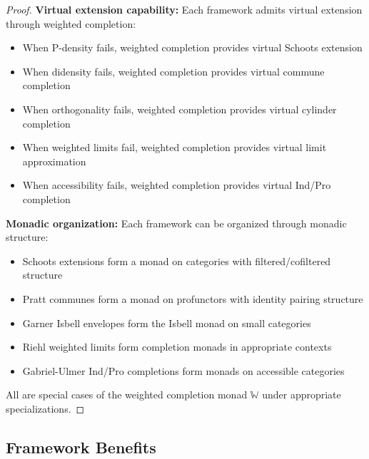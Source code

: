 \documentclass[11pt]{article}
\theoremstyle{plain}
\theoremstyle{definition}
\theoremstyle{remark}
\begin{document}
\begin{proof}
\textbf{Virtual extension capability:} Each framework admits virtual extension through weighted completion:

\begin{itemize}
\item When P-density fails, weighted completion provides virtual Schoots extension
\item When didensity fails, weighted completion provides virtual commune completion
\item When orthogonality fails, weighted completion provides virtual cylinder completion
\item When weighted limits fail, weighted completion provides virtual limit approximation
\item When accessibility fails, weighted completion provides virtual Ind/Pro completion
\end{itemize}

\textbf{Monadic organization:} Each framework can be organized through monadic structure:
\begin{itemize}
\item Schoots extensions form a monad on categories with filtered/cofiltered structure
\item Pratt communes form a monad on profunctors with identity pairing structure
\item Garner Isbell envelopes form the Isbell monad on small categories
\item Riehl weighted limits form completion monads in appropriate contexts
\item Gabriel-Ulmer Ind/Pro completions form monads on accessible categories
\end{itemize}

All are special cases of the weighted completion monad $\mathbb{W}$ under appropriate specializations.
\end{proof}

\subsection{Framework Benefits}
\end{document}
